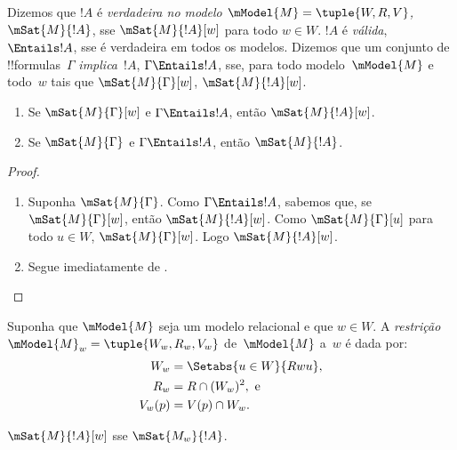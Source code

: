 \documentclass[../../../include/open-logic-section]{subfiles}
\begin{document}


\begin{defn}
  Dizemos que $!A$ é \emph{verdadeira no modelo
  $\mModel{M} = \tuple{W,R,V}$,} $\mSat{M}{!A}$, sse
  $\mSat{M}{!A}[w]$ para todo $w \in W$. $!A$ é \emph{válida},
  $\Entails !A$, sse é verdadeira em todos os modelos. Dizemos que um
  conjunto de !!{formula}s~$\Gamma$ \emph{implica}~$!A$, $\Gamma
  \Entails !A$, sse, para todo modelo~$\mModel{M}$ e todo~$w$ tais
  que $\mSat{M}{\Gamma}[w]$, $\mSat{M}{!A}[w]$.
\end{defn}

\begin{prop}
  \begin{enumerate}
  \item{} Se $\mSat{M}{\Gamma}[w]$ e
    $\Gamma \Entails !A$, então $\mSat{M}{!A}[w]$.
  \item{} Se $\mSat{M}{\Gamma}$ e $\Gamma
    \Entails !A$, então $\mSat{M}{!A}$.
  \end{enumerate}
\end{prop}

\begin{proof}
  \begin{enumerate}
  \item Suponha $\mSat{M}{\Gamma}$. Como $\Gamma \Entails !A$,
    sabemos que, se $\mSat{M}{\Gamma}[w]$, então
    $\mSat{M}{!A}[w]$. Como $\mSat{M}{\Gamma}[u]$ para todo
    $u \in W$, $\mSat{M}{\Gamma}[w]$. Logo $\mSat{M}{!A}[w]$.
  \item Segue imediatamente de .
  \end{enumerate}
\end{proof}


\begin{defn}
  Suponha que $\mModel{M}$ seja um modelo relacional e que $w \in W$.
  A \emph{restrição} $\mModel{M}_w=\tuple{W_w, R_w, V_w}$
  de~$\mModel{M}$ a~$w$ é dada por:
  \begin{align*}
    W_w & = \Setabs{u \in W}{Rwu},\\
    R_w  & = R \cap (W_w)^2, \text{ e}\\
    V_w(p) & = V(p) \cap W_w.
  \end{align*}
\end{defn}

\begin{prop}
  $\mSat{M}{!A}[w]$ sse $\mSat{M_w}{!A}$.
\end{prop}
\end{document}
